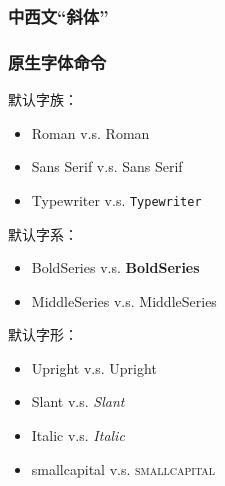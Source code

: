         \subsubsection{中西文“斜体”}
        \subsubsection{原生字体命令}
        
            默认字族：\familydefault %
            \begin{itemize}
                \item Roman v.s. \textrm{Roman} %
                \item Sans Serif v.s. \textsf{Sans Serif} %
                \item Typewriter v.s. \texttt{Typewriter} %
            \end{itemize}
        
            默认字系：\seriesdefault %
            \begin{itemize}
                \item BoldSeries v.s. \textbf{BoldSeries} %
                \item MiddleSeries v.s. \textmd{MiddleSeries} %
            \end{itemize}

            默认字形：\shapedefault 
            \begin{itemize}
                \item Upright v.s. \textup{Upright} %
                \item Slant v.s. \textsl{Slant} %
                \item Italic v.s. \textit{Italic} %
                \item smallcapital v.s. \textsc{smallcapital} %
            \end{itemize}

